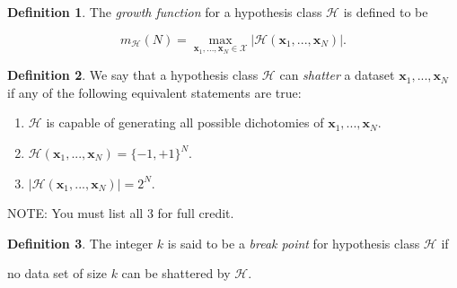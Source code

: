 \documentclass[10pt]{exam}
\theoremstyle{definition}
\newtheorem{defn}{Definition}
\newcommand{\x}{\mathbf x}
\begin{document}
\newpage
\begin{defn}
    The \emph{growth function} for a hypothesis class $\mathcal H$ is defined to be
    \begin{solutionorbox}[1in]
    \begin{equation*}
        m_{\mathcal H}(N) = \max_{\x_1,...,\x_N\in\mathcal X} \big| \mathcal H(\x_1, ..., \x_N) \big|.
    \end{equation*}
    \end{solutionorbox}
\end{defn}

\begin{defn}
    We say that a hypothesis class $\mathcal H$ can \emph{shatter} a dataset $\x_1, ..., \x_N$ if any of the following equivalent statements are true:
    \begin{solutionorbox}[1in]
    \begin{enumerate}
        \item $\mathcal H$ is capable of generating all possible dichotomies of $\x_1, ..., \x_N$.
        \item $\mathcal H(\x_1, ..., \x_N) = \{-1, +1\}^N$.
        \item $\left|\mathcal H(\x_1, ..., \x_N)\right| = 2^N$.
    \end{enumerate}

        NOTE: You must list all 3 for full credit.
    \end{solutionorbox}
\end{defn}
\begin{defn}
The integer $k$ is said to be a \emph{break point} for hypothesis class $\mathcal H$ if
    \begin{solutionorbox}[1in]
    no data set of size $k$ can be shattered by $\mathcal H$.
    \end{solutionorbox}
\end{defn}
\end{document}
